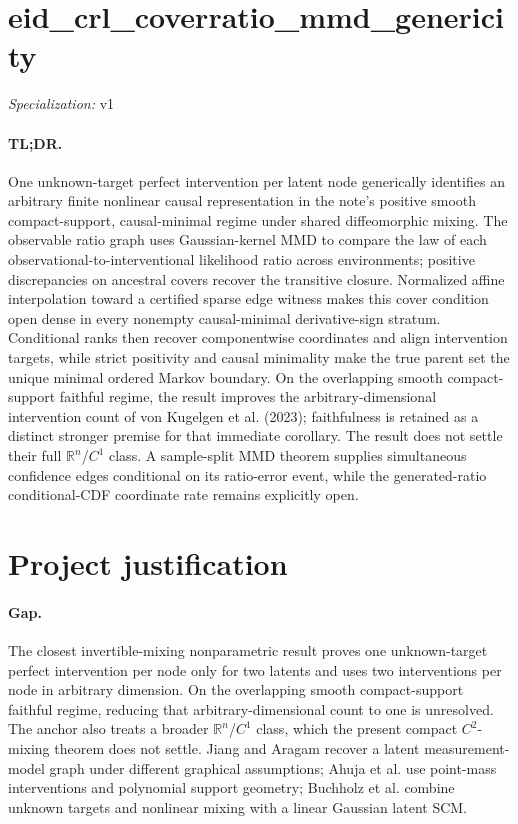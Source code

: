 \documentclass{article}
\begin{document}
\sloppy

\section*{eid\_\allowbreak{}crl\_\allowbreak{}coverratio\_\allowbreak{}mmd\_\allowbreak{}genericity}

\noindent\textit{Specialization:} v1\par

\paragraph{TL;DR.} One unknown-target perfect intervention per latent node generically identifies an arbitrary finite nonlinear causal representation in the note's positive smooth compact-support, causal-minimal regime under shared diffeomorphic mixing. The observable ratio graph uses Gaussian-kernel MMD to compare the law of each observational-to-interventional likelihood ratio across environments; positive discrepancies on ancestral covers recover the transitive closure. Normalized affine interpolation toward a certified sparse edge witness makes this cover condition open dense in every nonempty causal-minimal derivative-sign stratum. Conditional ranks then recover componentwise coordinates and align intervention targets, while strict positivity and causal minimality make the true parent set the unique minimal ordered Markov boundary. On the overlapping smooth compact-support faithful regime, the result improves the arbitrary-dimensional intervention count of von Kugelgen et al. (2023); faithfulness is retained as a distinct stronger premise for that immediate corollary. The result does not settle their full \(\mathbb R^n\)/\(C^1\) class. A sample-split MMD theorem supplies simultaneous confidence edges conditional on its ratio-error event, while the generated-ratio conditional-CDF coordinate rate remains explicitly open.

\section{Project justification}

\paragraph{Gap.} The closest invertible-mixing nonparametric result proves one unknown-target perfect intervention per node only for two latents and uses two interventions per node in arbitrary dimension. On the overlapping smooth compact-support faithful regime, reducing that arbitrary-dimensional count to one is unresolved. The anchor also treats a broader \(\mathbb R^n\)/\(C^1\) class, which the present compact \(C^2\)-mixing theorem does not settle. Jiang and Aragam recover a latent measurement-model graph under different graphical assumptions; Ahuja et al. use point-mass interventions and polynomial support geometry; Buchholz et al. combine unknown targets and nonlinear mixing with a linear Gaussian latent SCM.
\end{document}
